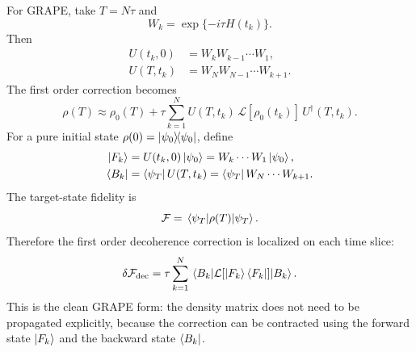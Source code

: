 \documentclass{simple-notes}
\begin{document}
For GRAPE, take $T=N\tau$ and
\begin{equation}
    W_k = \exp\{-i\tau H(t_k)\}.
\end{equation}
Then
\begin{align}
    U(t_k,0) &= W_k W_{k-1}\cdots W_1,\\
    U(T,t_k) &= W_N W_{N-1}\cdots W_{k+1}.
\end{align}
The first order correction becomes
\begin{equation}
    \rho(T)
    \approx
    \rho_0(T)
    +
    \tau
    \sum_{k=1}^{N}
    U(T,t_k)\,
    \mathcal{L}[\rho_0(t_k)]\,
    U^\dagger(T,t_k).
    \label{eq:discrete_lindblad_correction}
\end{equation}
For a pure initial state $\rho(0)=\ketbra{\psi_0}$, define
\begin{align}
    \ket{F_k}
    &=
    U(t_k,0)\ket{\psi_0}
    =
    W_k\cdots W_1\ket{\psi_0},
    \\
    \bra{B_k}
    &=
    \bra{\psi_T}U(T,t_k)
    =
    \bra{\psi_T}W_N\cdots W_{k+1}.
\end{align}
The target-state fidelity is
\begin{equation}
    \mathcal{F}
    =
    \mel{\psi_T}{\rho(T)}{\psi_T}.
\end{equation}
Therefore the first order decoherence correction is localized on each time
slice:
\begin{equation}
    \delta \mathcal{F}_{\mathrm{dec}}
    =
    \tau
    \sum_{k=1}^{N}
    \mel{B_k}{
        \mathcal{L}[\ket{F_k}\bra{F_k}]
    }{B_k}.
    \label{eq:decoherence_fidelity_correction}
\end{equation}
This is the clean GRAPE form: the density matrix does not need to be
propagated explicitly, because the correction can be contracted using the
forward state $\ket{F_k}$ and the backward state $\bra{B_k}$.
\end{document}
